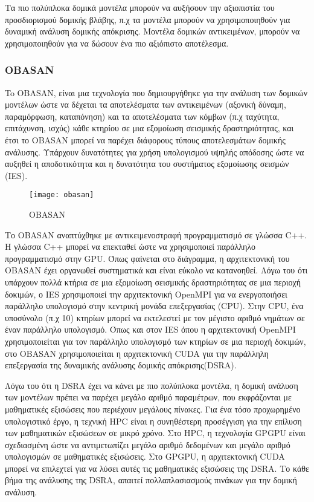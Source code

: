 Τα πιο πολύπλοκα δομικά μοντέλα μπορούν να αυξήσουν την αξιοπιστία του προσδιορισμού δομικής βλάβης, π.χ τα μοντέλα μπορούν να χρησιμοποιηθούν για δυναμική ανάλυση δομικής απόκρισης. Μοντέλα δομικών αντικειμένων, μπορούν να χρησιμοποιηθούν για να δώσουν ένα πιο αξιόπιστο αποτέλεσμα. 

\subsubsection{OBASAN}
To OBASAN, είναι μια τεχνολογία που δημιουργήθηκε για την ανάλυση των δομικών μοντέλων ώστε να δέχεται τα αποτελέσματα των αντικειμένων (αξονική δύναμη, παραμόρφωση, καταπόνηση) και τα αποτελέσματα των κόμβων (π.χ ταχύτητα, επιτάχυνση, ισχύς) κάθε κτηρίου σε μια εξομοίωση σεισμικής δραστηριότητας, και έτσι το OBASAN μπορεί να παρέχει διάφορους τύπους αποτελεσμάτων δομικής ανάλυσης. Υπάρχουν δυνατότητες για χρήση υπολογισμού υψηλής απόδοσης ώστε να αυξηθεί η αποδοτικότητα και η δυνατότητα του συστήματος εξομοίωσης σεισμών (IES). 

\begin{figure}[h]
\centering
\texttt{[image: obasan]}
\caption{OBASAN}
\end{figure}

Το OBASAN αναπτύχθηκε με αντικειμενοστραφή προγραμματισμό σε γλώσσα C++. Η γλώσσα C++ μπορεί να επεκταθεί ώστε να χρησιμοποιεί παράλληλο προγραμματισμό στην GPU. Όπως φαίνεται στο διάγραμμα, η αρχιτεκτονική του OBASAN έχει οργανωθεί συστηματικά και είναι εύκολο να κατανοηθεί. Λόγω του ότι υπάρχουν πολλά κτήρια σε μια εξομοίωση σεισμικής δραστηριότητας σε μια περιοχή δοκιμών, ο IES χρησιμοποιεί την αρχιτεκτονική OpenMPI για να ενεργοποιήσει παράλληλο υπολογισμό στην κεντρική μονάδα επεξεργασίας (CPU). Στην CPU, ένα υποσύνολο (π.χ 10) κτηρίων μπορεί να εκτελεστεί με τον μέγιστο αριθμό νημάτων σε έναν παράλληλο υπολογισμό. Όπως και στον IES όπου η αρχιτεκτονική OpenMPI χρησιμοποιείται για τον παράλληλο υπολογισμό των κτηρίων σε μια περιοχή δοκιμών, στο OBASAN χρησιμοποιείται η αρχιτεκτονική CUDA για την παράλληλη επεξεργασία της δυναμικής ανάλυσης δομικής απόκρισης(DSRA).

Λόγω του ότι η DSRA έχει να κάνει με πιο πολύπλοκα μοντέλα, η δομική ανάλυση των μοντέλων πρέπει να παρέχει μεγάλο αριθμό παραμέτρων, που εκφράζονται με μαθηματικές εξισώσεις που περιέχουν μεγάλους πίνακες. Για ένα τόσο προχωρημένο υπολογιστικό έργο, η τεχνική HPC είναι η συνηθέστερη προσέγγιση για την επίλυση των μαθηματικών εξισώσεων σε μικρό χρόνο. Στο HPC, η τεχνολογία GPGPU είναι σχεδιασμένη ώστε να αντιμετωπίζει μεγάλο αριθμό δεδομένων και μεγάλο αριθμό υπολογισμών σε μαθηματικές εξισώσεις. Στο GPGPU, η αρχιτεκτονική CUDA μπορεί να επιλεχτεί για να λύσει αυτές τις μαθηματικές εξισώσεις της DSRA. Το κάθε βήμα της ανάλυσης της DSRA, απαιτεί πολλαπλασιασμούς πινάκων για την δομική ανάλυση.

